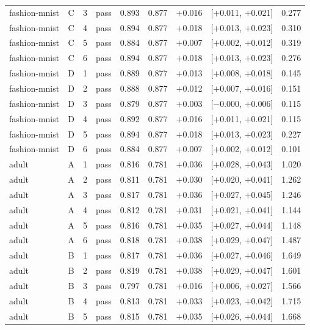 {\begin{longtable}{lccl rrrcr}
fashion-mnist & C & 3 & pass & 0.893 & 0.877 & $+$0.016 & [$+$0.011, $+$0.021] & 0.277 \\
fashion-mnist & C & 4 & pass & 0.894 & 0.877 & $+$0.018 & [$+$0.013, $+$0.023] & 0.310 \\
fashion-mnist & C & 5 & pass & 0.884 & 0.877 & $+$0.007 & [$+$0.002, $+$0.012] & 0.319 \\
fashion-mnist & C & 6 & pass & 0.894 & 0.877 & $+$0.018 & [$+$0.013, $+$0.023] & 0.276 \\
\addlinespace[2pt]
fashion-mnist & D & 1 & pass & 0.889 & 0.877 & $+$0.013 & [$+$0.008, $+$0.018] & 0.145 \\
fashion-mnist & D & 2 & pass & 0.888 & 0.877 & $+$0.012 & [$+$0.007, $+$0.016] & 0.151 \\
fashion-mnist & D & 3 & pass & 0.879 & 0.877 & $+$0.003 & [$-$0.000, $+$0.006] & 0.115 \\
fashion-mnist & D & 4 & pass & 0.892 & 0.877 & $+$0.016 & [$+$0.011, $+$0.021] & 0.115 \\
fashion-mnist & D & 5 & pass & 0.894 & 0.877 & $+$0.018 & [$+$0.013, $+$0.023] & 0.227 \\
fashion-mnist & D & 6 & pass & 0.884 & 0.877 & $+$0.007 & [$+$0.002, $+$0.012] & 0.101 \\
\midrule
adult & A & 1 & pass & 0.816 & 0.781 & $+$0.036 & [$+$0.028, $+$0.043] & 1.020 \\
adult & A & 2 & pass & 0.811 & 0.781 & $+$0.030 & [$+$0.020, $+$0.041] & 1.262 \\
adult & A & 3 & pass & 0.817 & 0.781 & $+$0.036 & [$+$0.027, $+$0.045] & 1.246 \\
adult & A & 4 & pass & 0.812 & 0.781 & $+$0.031 & [$+$0.021, $+$0.041] & 1.144 \\
adult & A & 5 & pass & 0.816 & 0.781 & $+$0.035 & [$+$0.027, $+$0.044] & 1.148 \\
adult & A & 6 & pass & 0.818 & 0.781 & $+$0.038 & [$+$0.029, $+$0.047] & 1.487 \\
\addlinespace[2pt]
adult & B & 1 & pass & 0.817 & 0.781 & $+$0.036 & [$+$0.027, $+$0.046] & 1.649 \\
adult & B & 2 & pass & 0.819 & 0.781 & $+$0.038 & [$+$0.029, $+$0.047] & 1.601 \\
adult & B & 3 & pass & 0.797 & 0.781 & $+$0.016 & [$+$0.006, $+$0.027] & 1.566 \\
adult & B & 4 & pass & 0.813 & 0.781 & $+$0.033 & [$+$0.023, $+$0.042] & 1.715 \\
adult & B & 5 & pass & 0.815 & 0.781 & $+$0.035 & [$+$0.026, $+$0.044] & 1.668 \\

\end{longtable}}
